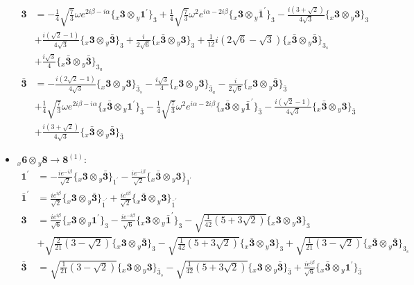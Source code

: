 \documentclass[english]{article}
\newcommand{\rep}[1]{\mathbf{#1}}
\newcommand{\repx}[2]{{}_{#2}\mathbf{#1}}
\newcommand{\tsprodx}[2]{\repx{#1}{x}\otimes\repx{#2}{y}}
\newcommand{\subcgt}[3]{\big\{ \tsprodx{#1}{#2}\big\}^{}_{#3}}
\begin{document}
\begin{itemize}
\begin{align*}
\\
\rep{3} & = -\frac{1}{4} \sqrt{\frac{7}{3}} \omega  e^{2 i \beta -i \alpha }\subcgt{3}{1^{\prime}}{3}+\frac{1}{4} \sqrt{\frac{7}{3}} \omega ^2 e^{i \alpha -2 i \beta }\subcgt{3}{\bar{1}^{\prime}}{3}-\frac{i \left(3+\sqrt{2}\right)}{4 \sqrt{3}}\subcgt{3}{3}{3} \\ 
 & +\frac{i \left(\sqrt{2}-1\right)}{4 \sqrt{3}}\subcgt{3}{\bar{3}}{3}+\frac{i}{2 \sqrt{6}}\subcgt{\bar{3}}{3}{3}+\frac{1}{12} i \left(2 \sqrt{6}-\sqrt{3}\right)\subcgt{\bar{3}}{\bar{3}}{3_{s}} \\ 
 & +\frac{i \sqrt{3}}{4}\subcgt{\bar{3}}{\bar{3}}{3_{a}}
\\
\rep{\bar{3}} & = -\frac{i \left(2 \sqrt{2}-1\right)}{4 \sqrt{3}}\subcgt{3}{3}{\bar{3}_{s}}-\frac{i \sqrt{3}}{4}\subcgt{3}{3}{\bar{3}_{a}}-\frac{i}{2 \sqrt{6}}\subcgt{3}{\bar{3}}{\bar{3}} \\ 
 & +\frac{1}{4} \sqrt{\frac{7}{3}} \omega  e^{2 i \beta -i \alpha }\subcgt{\bar{3}}{1^{\prime}}{\bar{3}}-\frac{1}{4} \sqrt{\frac{7}{3}} \omega ^2 e^{i \alpha -2 i \beta }\subcgt{\bar{3}}{\bar{1}^{\prime}}{\bar{3}}-\frac{i \left(\sqrt{2}-1\right)}{4 \sqrt{3}}\subcgt{\bar{3}}{3}{\bar{3}} \\ 
 & +\frac{i \left(3+\sqrt{2}\right)}{4 \sqrt{3}}\subcgt{\bar{3}}{\bar{3}}{\bar{3}}
\end{align*}
\item $\tsprodx{6}{8}\to\rep{8}^{(1)}$:
\begin{align*}
\rep{1^{\prime}} & = -\frac{i e^{-i \beta }}{\sqrt{2}}\subcgt{3}{\bar{3}}{1^{\prime}}-\frac{i e^{-i \beta }}{\sqrt{2}}\subcgt{\bar{3}}{3}{1^{\prime}}
\\
\rep{\bar{1}^{\prime}} & = \frac{i e^{i \beta }}{\sqrt{2}}\subcgt{3}{\bar{3}}{\bar{1}^{\prime}}+\frac{i e^{i \beta }}{\sqrt{2}}\subcgt{\bar{3}}{3}{\bar{1}^{\prime}}
\\
\rep{3} & = \frac{i e^{i \beta }}{\sqrt{6}}\subcgt{3}{1^{\prime}}{3}-\frac{i e^{-i \beta }}{\sqrt{6}}\subcgt{3}{\bar{1}^{\prime}}{3}-\sqrt{\frac{1}{42} \left(5+3 \sqrt{2}\right)}\subcgt{3}{3}{3} \\ 
 & +\sqrt{\frac{2}{21} \left(3-\sqrt{2}\right)}\subcgt{3}{\bar{3}}{3}-\sqrt{\frac{1}{42} \left(5+3 \sqrt{2}\right)}\subcgt{\bar{3}}{3}{3}+\sqrt{\frac{1}{21} \left(3-\sqrt{2}\right)}\subcgt{\bar{3}}{\bar{3}}{3_{s}}
\\
\rep{\bar{3}} & = \sqrt{\frac{1}{21} \left(3-\sqrt{2}\right)}\subcgt{3}{3}{\bar{3}_{s}}-\sqrt{\frac{1}{42} \left(5+3 \sqrt{2}\right)}\subcgt{3}{\bar{3}}{\bar{3}}+\frac{i e^{i \beta }}{\sqrt{6}}\subcgt{\bar{3}}{1^{\prime}}{\bar{3}} \\ 

\end{align*}
\end{itemize}
\end{document}
